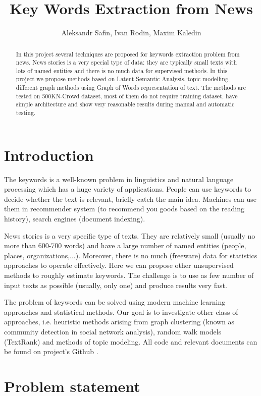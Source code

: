 \documentclass[a4paper]{article}
\title{Key Words Extraction from News}
\author{Aleksandr Safin, Ivan Rodin, Maxim Kaledin}
\begin{document}
\maketitle
\begin{abstract}
In this project several techniques are proposed for keywords extraction problem from news. News stories is a very special type of data: they are typically small texts with lots of named entities and there is no much data for supervised methods. In this project we propose methods based on Latent Semantic Analysis, topic modelling, different graph methods using Graph of Words representation of text. The methods are tested on 500KN-Crowd dataset, most of them do not require training dataset, have simple architecture and show very reasonable results during manual and automatic testing.
\end{abstract}
\section*{Introduction}

The keywords is a well-known problem in linguistics and natural language processing which has a huge variety of applications. People can use keywords to decide whether the text is relevant, briefly catch the main idea. Machines can use them in recommender system (to recommend you goods based on the reading history), search engines (document indexing).

News stories is a very specific type of texts. They are relatively small (usually no more than 600-700 words) and have a large number of named entities (people, places, organizations,...). Moreover, there is no much (freeware) data for statistics approaches to operate effectively. Here we can propose other unsupervised methods to roughly estimate keywords. The challenge is to use as few number of input texts as possible (usually, only one) and produce results very fast.

The problem of keywords can be solved using modern machine learning approaches and statistical methods. Our goal is to investigate other class of approaches, i.e. heuristic methods arising from graph clustering (known as community detection in social network analysis), random walk models (TextRank) and methods of topic modeling. All code and relevant documents can be found on project's Github \cite{our:Github}.

\section*{Problem statement}
\end{document}
